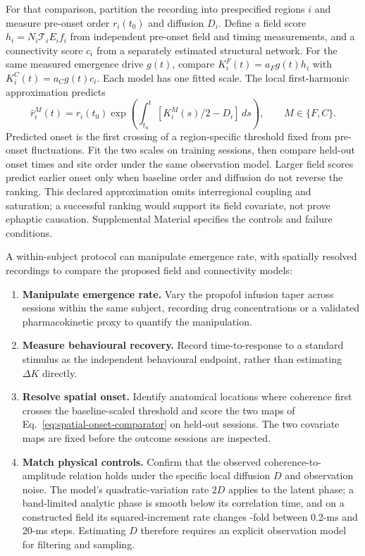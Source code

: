 \documentclass[12pt]{article}
\begin{document}
For that comparison, partition the recording into prespecified regions $i$ and measure pre-onset order $r_i(t_0)$ and diffusion $D_i$. Define a field score $h_i=N_i\mathcal{T}_iE_i f_i$ from independent pre-onset field and timing measurements, and a connectivity score $c_i$ from a separately estimated structural network. For the same measured emergence drive $g(t)$, compare $K_i^{F}(t)=a_Fg(t)h_i$ with $K_i^{C}(t)=a_Cg(t)c_i$. Each model has one fitted scale. The local first-harmonic approximation predicts
\begin{equation}
 \widehat r_i^{M}(t)=r_i(t_0)\exp\!\left(\int_{t_0}^{t}[K_i^{M}(s)/2-D_i] \,ds\right),
 \qquad M\in\{F,C\}.
 \label{eq:spatial-onset-comparator}
\end{equation}
Predicted onset is the first crossing of a region-specific threshold fixed from pre-onset fluctuations. Fit the two scales on training sessions, then compare held-out onset times and site order under the same observation model. Larger field scores predict earlier onset only when baseline order and diffusion do not reverse the ranking. This declared approximation omits interregional coupling and saturation; a successful ranking would support its field covariate, not prove ephaptic causation. Supplemental Material specifies the controls and failure conditions.

A within-subject protocol can manipulate emergence rate, with spatially resolved recordings to compare the proposed field and connectivity models:
\begin{enumerate}
\item \textbf{Manipulate emergence rate.} Vary the propofol infusion taper across sessions within the same subject, recording drug concentrations or a validated pharmacokinetic proxy to quantify the manipulation.
\item \textbf{Measure behavioural recovery.} Record time-to-response to a standard stimulus as the independent behavioural endpoint, rather than estimating $\Delta K$ directly.
\item \label{item:spatial-onset}\textbf{Resolve spatial onset.} Identify anatomical locations where coherence first crosses the baseline-scaled threshold and score the two maps of Eq.~\eqref{eq:spatial-onset-comparator} on held-out sessions. The two covariate maps are fixed before the outcome sessions are inspected.
\item \label{item:physical-controls}\textbf{Match physical controls.} Confirm that the observed coherence-to-amplitude relation holds under the specific local diffusion $D$ and observation noise. The model's quadratic-variation rate $2D$ applies to the latent phase; a band-limited analytic phase is smooth below its correlation time, and on a constructed field its squared-increment rate changes \eegCheckQvRatio-fold between 0.2-ms and 20-ms steps. Estimating $D$ therefore requires an explicit observation model for filtering and sampling.
\end{enumerate}
\end{document}
